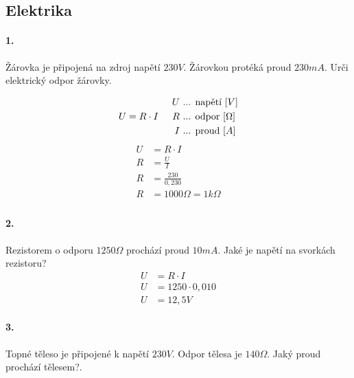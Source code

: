 \documentclass[12pt]{article}
\begin{document}
\subsection{Elektrika}
\paragraph{1.}
Žárovka je připojená na zdroj napětí $230V$. Žárovkou protéká proud $230mA$. Urči elektrický odpor žárovky.
\begin{multicols}{2}
\begin{equation}
\begin{split}
\nonumber
U = R\cdot I
\end{split}
\hspace{0,5cm}
\begin{split}
\nonumber
U&\text{ ... napětí }[V]\\
R&\text{ ... odpor }[\Omega]\\
I&\text{ ... proud }[A]\\
\end{split}
\end{equation}
\columnbreak
\noindent
\begin{equation}
\begin{split}
\nonumber
U &= R\cdot I\\
R &=  \frac{U}{I}\\
R &=  \frac{230}{0,230}\\
R &= 1000\Omega = 1k\Omega\\
\end{split}
\end{equation}
\end{multicols}

\paragraph{2.}
Rezistorem o odporu $1250\Omega$ prochází proud $10mA$. Jaké je napětí na svorkách rezistoru?
\begin{equation}
\begin{split}
\nonumber
U &= R\cdot I\\
U &= 1250\cdot 0,010\\
U &= 12,5V
\end{split}
\end{equation}

\paragraph{3.}
Topné těleso je připojené k napětí $230V$. Odpor tělesa je $140\Omega$. Jaký proud prochází tělesem?.
\end{document}

